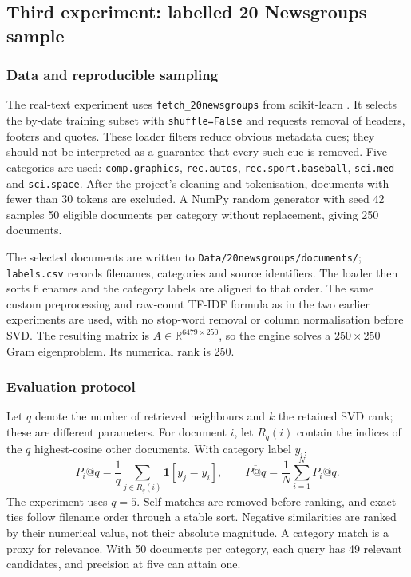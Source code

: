 \documentclass[12pt,a4paper]{report}
\newcommand{\R}{\mathbb{R}}
\theoremstyle{plain}
\theoremstyle{definition}
\theoremstyle{remark}
\theoremstyle{definition}
\begin{document}
\subsection{Third experiment: labelled 20 Newsgroups sample}
\label{sec:precision}

\subsubsection{Data and reproducible sampling}
The real-text experiment uses \texttt{fetch\_20newsgroups} from scikit-learn \cite{newsgroups}. It selects the by-date training subset with \texttt{shuffle=False} and requests removal of headers, footers and quotes. These loader filters reduce obvious metadata cues; they should not be interpreted as a guarantee that every such cue is removed. Five categories are used: \texttt{comp.graphics}, \texttt{rec.autos}, \texttt{rec.sport.baseball}, \texttt{sci.med} and \texttt{sci.space}. After the project's cleaning and tokenisation, documents with fewer than 30 tokens are excluded. A NumPy random generator with seed 42 samples 50 eligible documents per category without replacement, giving 250 documents.

The selected documents are written to \texttt{Data/20newsgroups/documents/}; \texttt{labels.csv} records filenames, categories and source identifiers. The loader then sorts filenames and the category labels are aligned to that order. The same custom preprocessing and raw-count TF-IDF formula as in the two earlier experiments are used, with no stop-word removal or column normalisation before SVD. The resulting matrix is $A\in\R^{6479\times250}$, so the engine solves a $250\times250$ Gram eigenproblem. Its numerical rank is 250.

\subsubsection{Evaluation protocol}
Let $q$ denote the number of retrieved neighbours and $k$ the retained SVD rank; these are different parameters. For document $i$, let $R_q(i)$ contain the indices of the $q$ highest-cosine other documents. With category label $y_i$,
\[
 P_i@q=\frac{1}{q}\sum_{j\in R_q(i)}\mathbf{1}[y_j=y_i],
 \qquad \overline{P@q}=\frac{1}{N}\sum_{i=1}^{N}P_i@q.
\]
The experiment uses $q=5$. Self-matches are removed before ranking, and exact ties follow filename order through a stable sort. Negative similarities are ranked by their numerical value, not their absolute magnitude. A category match is a proxy for relevance. With 50 documents per category, each query has 49 relevant candidates, and precision at five can attain one.
\end{document}
